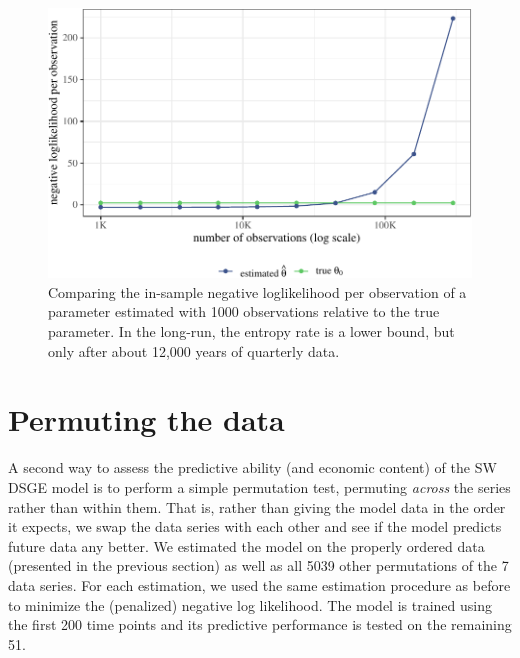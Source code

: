 \documentclass[11pt]{article}
\begin{document}
\begin{figure}[t]

{\centering \includegraphics{gfx/entropy-investigation-1} 

}

\caption{Comparing the in-sample negative loglikelihood per observation of a parameter estimated with 1000 observations relative to the true parameter. In the long-run, the entropy rate is a lower bound, but only after about 12,000 years of quarterly data.}\label{fig:entropy-investigation}
\end{figure}

\clearpage

\hypertarget{sec:permutation-summary}{%
\section{Permuting the data}\label{sec:permutation-summary}}

A second way to assess the predictive ability (and economic content) of
the SW DSGE model is to perform a simple permutation test, permuting
\emph{across} the series rather than within them. That is, rather than
giving the model data in the order it expects, we swap the data series
with each other and see if the model predicts future data any better. We
estimated the model on the properly ordered data (presented in the
previous section) as well as all 5039 other permutations of the 7 data
series. For each estimation, we used the same estimation procedure as
before to minimize the (penalized) negative log likelihood. The model is
trained using the first 200 time points and its predictive performance
is tested on the remaining 51.
\end{document}
